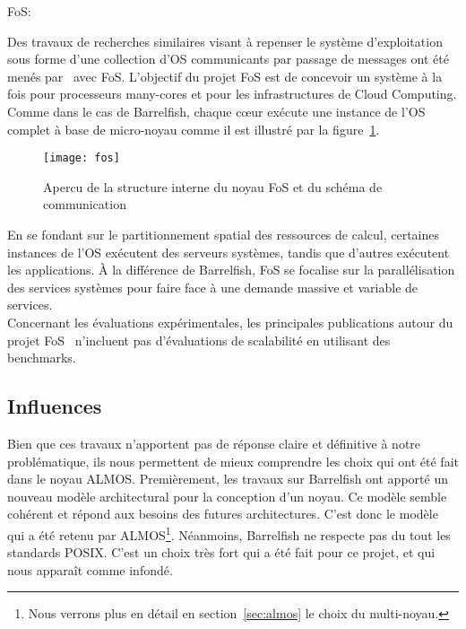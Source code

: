       \begin{paragraph}{FoS:}

        Des travaux de recherches similaires visant à repenser le système
        d’exploitation sous forme d’une collection d’OS communicants par passage
        de messages ont été menés par~\citet{wentzlaff2009factored} avec
        FoS. L’objectif du projet FoS est de concevoir un système à la fois pour
        processeurs many-cores et pour les infrastructures de Cloud
        Computing. Comme dans le cas de Barrelfish, chaque c\oe ur exécute une
        instance de l’OS complet à base de micro-noyau comme il est illustré par
        la figure~\ref{fig:fos}.

        \begin{figure}[h]
          \centering
          \texttt{[image: fos]}
          \caption{Apercu de la structure interne du noyau FoS et du schéma de
            communication}
          \label{fig:fos}
        \end{figure}

         En se fondant sur le partitionnement spatial des
        ressources de calcul, certaines instances de l’OS exécutent des serveurs
        systèmes, tandis que d’autres exécutent les applications. À la
        différence de Barrelfish, FoS se focalise sur la parallélisation des
        services systèmes pour faire face à une demande massive et variable de
        services.\\

        Concernant les évaluations expérimentales, les principales publications
        autour du projet FoS~\citep{wentzlaff2009factored,
          wentzlaff2010operating} n’incluent pas d'évaluations de scalabilité en
        utilisant des benchmarks.

      \end{paragraph}
      
    \subsection{Influences}

      Bien que ces travaux n'apportent pas de réponse claire et définitive à
      notre problématique, ils nous permettent de mieux comprendre les choix qui
      ont été fait dans le noyau ALMOS. Premièrement, les travaux sur Barrelfish
      ont apporté un nouveau modèle architectural pour la conception d'un
      noyau. Ce modèle semble cohérent et répond aux besoins des futures
      architectures. C'est donc le modèle qui a été retenu par
      ALMOS\footnote{Nous verrons plus en détail en section~\ref{sec:almos} le
        choix du multi-noyau.}. Néanmoins, Barrelfish ne respecte pas du tout
      les standards POSIX. C'est un choix très fort qui a été fait pour ce
      projet, et qui nous apparaît comme infondé.

